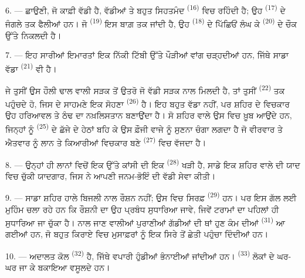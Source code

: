 \VUsaut{5.0mm}
\VUsaut{3.4mm}

6. --- ਛਾਉਣੀ, ਜੋ ਕਾਫ਼ੀ ਵੱਡੀ ਹੈ, ਵੱਡੀਆਂ ਤੇ ਬਹੁਤ ਸਿਹਤਮੰਦ 
\textsuperscript{(16)} ਵਿਚ ਰਹਿੰਦੀ ਹੈ; ਉਹ  \textsuperscript{(17)}
ਦੇ ਜੰਗਲੇ ਤਕ ਫੈਲੀਆਂ ਹਨ। ਜੋ  \textsuperscript{(19)} ਇਸ ਬਾਗ਼ ਤਕ ਜਾਂਦੀ
ਹੈ, ਉਹ  \textsuperscript{(18)} ਦੇ ਪਿੱਛਿਓਂ ਲੰਘ ਕੇ
 \textsuperscript{(20)} ਦੇ ਚੌਕ ਉੱਤੇ ਨਿਕਲਦੀ ਹੈ।

7. --- ਇਹ ਸਾਰੀਆਂ ਇਮਾਰਤਾਂ ਇਕ ਨਿੱਕੀ ਟਿੱਬੀ ਉੱਤੇ ਪੌੜੀਆਂ ਵਾਂਗ ਚੜ੍ਹਦੀਆਂ ਹਨ, ਜਿੱਥੇ ਸਾਡਾ
ਵੱਡਾ  \textsuperscript{(21)} ਵੀ ਹੈ।

ਜੇ ਤੁਸੀਂ ਉਸ ਹੌਲੀ ਢਾਲ ਵਾਲੀ ਸੜਕ ਤੋਂ ਉਤਰੋ ਜੋ ਵੱਡੀ ਸੜਕ ਨਾਲ ਮਿਲਦੀ ਹੈ, ਤਾਂ ਤੁਸੀਂ
 \textsuperscript{(22)} ਤਕ ਪਹੁੰਚਦੇ ਹੋ, ਜਿਸ ਦੇ ਸਾਹਮਣੇ ਇਕ ਸੋਹਣਾ
 \textsuperscript{(26)} ਹੈ। ਇਹ  ਬਹੁਤ ਵੱਡਾ ਨਹੀਂ, ਪਰ
ਸ਼ਹਿਰ ਦੇ ਵਿਚਕਾਰ ਉਹ ਹਰਿਆਵਲ ਤੇ ਠੰਢ ਦਾ ਨਖ਼ਲਿਸਤਾਨ ਬਣਾਉਂਦਾ ਹੈ। ਸੋ ਸ਼ਹਿਰ ਵਾਲੇ ਉਸ ਵਿਚ
ਖ਼ੂਬ ਆਉਂਦੇ ਹਨ, ਜਿਨ੍ਹਾਂ ਨੂੰ  \textsuperscript{(25)} ਦੇ ਛੱਜੇ ਦੇ ਹੇਠਾਂ
ਬਹਿ ਕੇ ਉਸ ਫ਼ੌਜੀ ਵਾਜੇ ਨੂੰ ਸੁਣਨਾ ਚੰਗਾ ਲਗਦਾ ਹੈ ਜੋ ਵੀਰਵਾਰ ਤੇ ਐਤਵਾਰ ਨੂੰ ਲਾਨ ਤੇ
ਕਿਆਰੀਆਂ ਵਿਚਕਾਰ ਬਣੇ  \textsuperscript{(27)} ਵਿਚ ਵੱਜਦਾ ਹੈ।

8. --- ਉਨ੍ਹਾਂ ਹੀ ਲਾਨਾਂ ਵਿਚੋਂ ਇਕ ਉੱਤੇ ਕਾਂਸੀ ਦੀ ਇਕ 
\textsuperscript{(28)} ਖੜੀ ਹੈ, ਸਾਡੇ ਇਕ ਸ਼ਹਿਰ ਵਾਲੇ ਦੀ ਯਾਦ ਵਿਚ ਚੁੱਕੀ ਯਾਦਗਾਰ, ਜਿਸ ਨੇ
ਆਪਣੀ ਜਨਮ-ਭੋਇੰ ਦੀ ਵੱਡੀ ਸੇਵਾ ਕੀਤੀ।

\VUsaut{4.0mm}
\VUsaut{3.4mm}

9. --- ਸਾਡਾ ਸ਼ਹਿਰ ਹਾਲੇ ਬਿਜਲੀ ਨਾਲ ਰੌਸ਼ਨ ਨਹੀਂ; ਉਸ ਵਿਚ ਸਿਰਫ਼ 
\textsuperscript{(29)} ਹਨ। ਪਰ  ਇਸ ਗੱਲ ਲਈ ਮੁਹਿੰਮ ਚਲਾ ਰਹੇ ਹਨ ਕਿ
ਰੌਸ਼ਨੀ ਦਾ ਉਹ ਪ੍ਰਬੰਧ ਸੁਧਾਰਿਆ ਜਾਵੇ, ਜਿਵੇਂ ਟਰਾਮਾਂ ਦਾ 
ਪਹਿਲਾਂ ਹੀ ਸੁਧਾਰਿਆ ਜਾ ਚੁੱਕਾ ਹੈ।  ਨਾਲ  ਜਾਣ ਵਾਲੀਆਂ
ਪੁਰਾਣੀਆਂ ਗੱਡੀਆਂ ਦੀ ਥਾਂ ਹੁਣ ਕੰਮ ਦੀਆਂ 
\textsuperscript{(31)} ਆ ਗਈਆਂ ਹਨ, ਜੋ ਬਹੁਤ  ਕਿਰਾਏ ਵਿਚ ਮੁਸਾਫ਼ਰਾਂ ਨੂੰ
 ਇਕ ਸਿਰੇ ਤੋਂ  ਛੇਤੀ ਪਹੁੰਚਾ ਦਿੰਦੀਆਂ ਹਨ।

10. --- ਅਦਾਲਤ ਕੋਲ  \textsuperscript{(32)} ਹੈ, ਜਿੱਥੇ ਵਪਾਰੀ ਹੁੰਡੀਆਂ
ਭੰਨਾਈਆਂ ਜਾਂਦੀਆਂ ਹਨ।  \textsuperscript{(33)} ਲੋਕਾਂ ਦੇ
ਘਰ-ਘਰ ਜਾ ਕੇ ਬਕਾਇਆ ਵਸੂਲਦੇ ਹਨ।

\VUsaut{4.0mm}
\VUsaut{3.4mm}

